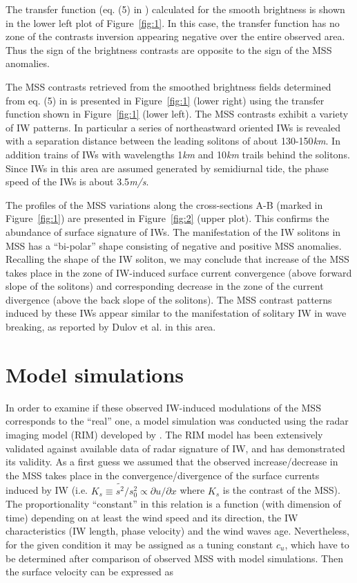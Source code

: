 \documentclass[preprint,authoryear,12pt]{elsarticle}
\begin{document}
The transfer function (eq. (5) in \citep{Kudryavtsev2012a}) calculated for the smooth brightness is shown in the lower left plot of Figure~\ref{fig:1}. In this case, the transfer function has no zone of the contrasts inversion appearing negative over the entire observed area. Thus the sign of the brightness contrasts are opposite to the sign of the MSS anomalies.

The MSS contrasts retrieved from the smoothed brightness fields determined from eq. (5) in \citep{Kudryavtsev2012a} is presented in Figure~\ref{fig:1} (lower right) using the transfer function shown in Figure~\ref{fig:1} (lower left). The MSS contrasts exhibit a variety of IW patterns. In particular a series of northeastward oriented IWs is revealed with a separation  distance between the leading solitons of about 130-150\textit{km}. In addition trains of IWs with wavelengths 1\textit{km} and 10\textit{km} trails behind the solitons. Since IWs in this area are assumed generated by semidiurnal tide, the phase speed of the IWs is about 3.5\textit{m/s}.   

The profiles of the MSS variations along the cross-sections A-B (marked in Figure~\ref{fig:1}) are presented in Figure~\ref{fig:2} (upper plot).  This confirms the abundance of surface signature of IWs. The manifestation of the IW solitons in MSS has a ``bi-polar'' shape consisting of negative and positive MSS anomalies. Recalling the shape of the IW soliton, we may conclude that increase of the MSS takes place in the zone of IW-induced surface current convergence (above forward slope of the solitons) and corresponding decrease in the zone of the current divergence (above the back slope of the solitons). The MSS contrast patterns induced by these IWs appear similar to the manifestation of solitary IW in wave breaking, as reported by Dulov et al. \cite{Dulov1986} in this area.


\section{Model simulations}

In order to examine if these observed IW-induced modulations of the MSS corresponds to the ``real'' one,  a model simulation was conducted using the radar imaging model (RIM) developed by \cite{Kudryavtsev2005}. The RIM model has been extensively validated against available data of radar signature of IW, and has demonstrated its validity.  As a first guess we assumed that the observed increase/decrease in the MSS takes place in the convergence/divergence of the surface currents induced by IW (i.e. $K_s \equiv \tilde{s^2} / s_0^2 \propto \partial u / \partial x$ where $K_s$ is the contrast of the MSS). The proportionality ``constant'' in this relation is a function (with dimension of time) depending on at least the wind speed and its direction, the IW characteristics (IW length, phase velocity) and the wind waves age. Nevertheless, for the given condition it may be assigned as a tuning constant $c_u$, which have to be determined after comparison of observed MSS with model simulations.  Then the surface velocity can be expressed as
\end{document}
